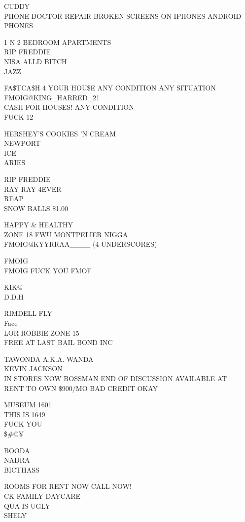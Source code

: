 \documentclass[10pt,letterpaper]{article}
\begin{document}
CUDDY\\
PHONE DOCTOR REPAIR BROKEN SCREENS ON IPHONES ANDROID PHONES

1 N 2 BEDROOM APARTMENTS\\
RIP FREDDIE\\
NISA ALLD BITCH\\
JAZZ

FA\$TCA\$H 4 YOUR HOU\$E ANY CONDITION ANY SITUATION\\
FMOIG@KING\_HARRED\_21\\
CASH FOR HOUSES!  ANY CONDITION\\
FUCK 12

HERSHEY'S COOKIES 'N CREAM\\
NEWPORT\\
ICE\\
ARIES

RIP FREDDIE\\
RAY RAY 4EVER\\
REAP\\
SNOW BALLS \$1.00

HAPPY \& HEALTHY\\
ZONE 18 FWU MONTPELIER NIGGA\\
FMOIG@KYYRRAA\_\_\_\_ (4 UNDERSCORES)

FMOIG\\
FMOIG FUCK YOU FMOF

KIK@\\
D.D.H

RIMDELL FLY\\
Face\\
LOR ROBBIE ZONE 15\\
FREE AT LAST BAIL BOND INC

TAWONDA A.K.A. WANDA\\
KEVIN JACKSON\\
IN STORES NOW BOSSMAN END OF DISCUSSION AVAILABLE AT\\
RENT TO OWN \$900/MO BAD CREDIT OKAY

MUSEUM 1601\\
THIS IS 1649\\
FUCK YOU\\
\$\#@¥

BOODA\\
NADRA\\
BICTHASS

ROOMS FOR RENT NOW CALL NOW!\\
CK FAMILY DAYCARE\\
QUA IS UGLY\\
SHELY
\end{document}

